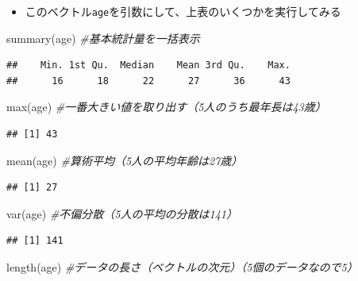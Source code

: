 \documentclass[
]{book}
\newenvironment{Shaded}{\begin{snugshade}}{\end{snugshade}}
\newcommand{\CommentTok}[1]{\textcolor[rgb]{0.56,0.35,0.01}{\textit{#1}}}
\newcommand{\FunctionTok}[1]{\textcolor[rgb]{0.00,0.00,0.00}{#1}}
\newcommand{\NormalTok}[1]{#1}
\providecommand{\tightlist}{%
  \setlength{\itemsep}{0pt}\setlength{\parskip}{0pt}}
\begin{document}
\begin{itemize}
\tightlist
\item
  このベクトル\texttt{age}を引数にして、上表のいくつかを実行してみる
\end{itemize}

\begin{Shaded}
\begin{Highlighting}[]
\FunctionTok{summary}\NormalTok{(age) }\CommentTok{\#基本統計量を一括表示}
\end{Highlighting}
\end{Shaded}

\begin{verbatim}
##    Min. 1st Qu.  Median    Mean 3rd Qu.    Max. 
##      16      18      22      27      36      43
\end{verbatim}

\begin{Shaded}
\begin{Highlighting}[]
\FunctionTok{max}\NormalTok{(age) }\CommentTok{\#一番大きい値を取り出す（5人のうち最年長は43歳）}
\end{Highlighting}
\end{Shaded}

\begin{verbatim}
## [1] 43
\end{verbatim}

\begin{Shaded}
\begin{Highlighting}[]
\FunctionTok{mean}\NormalTok{(age) }\CommentTok{\#算術平均（5人の平均年齢は27歳）}
\end{Highlighting}
\end{Shaded}

\begin{verbatim}
## [1] 27
\end{verbatim}

\begin{Shaded}
\begin{Highlighting}[]
\FunctionTok{var}\NormalTok{(age) }\CommentTok{\#不偏分散（5人の平均の分散は141）}
\end{Highlighting}
\end{Shaded}

\begin{verbatim}
## [1] 141
\end{verbatim}

\begin{Shaded}
\begin{Highlighting}[]
\FunctionTok{length}\NormalTok{(age) }\CommentTok{\#データの長さ（ベクトルの次元）（5個のデータなので5）}
\end{Highlighting}
\end{Shaded}
\end{document}
